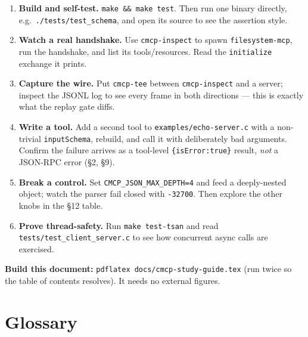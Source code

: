 \documentclass[10pt]{article}
\newcommand{\code}[1]{\texttt{\small #1}}
\begin{document}
\begin{enumerate}
  \item \textbf{Build and self-test.} \code{make \&\& make test}. Then run one
    binary directly, e.g.\ \code{./tests/test\_schema}, and open its source to see
    the assertion style.
  \item \textbf{Watch a real handshake.} Use \code{cmcp-inspect} to spawn
    \code{filesystem-mcp}, run the handshake, and list its tools/resources. Read
    the \code{initialize} exchange it prints.
  \item \textbf{Capture the wire.} Put \code{cmcp-tee} between
    \code{cmcp-inspect} and a server; inspect the JSONL log to see every frame in
    both directions --- this is exactly what the replay gate diffs.
  \item \textbf{Write a tool.} Add a second tool to \code{examples/echo-server.c}
    with a non-trivial \code{inputSchema}, rebuild, and call it with deliberately
    bad arguments. Confirm the failure arrives as a tool-level
    \code{\{isError:true\}} result, \emph{not} a JSON-RPC error (\S2, \S9).
  \item \textbf{Break a control.} Set \code{CMCP\_JSON\_MAX\_DEPTH=4} and feed a
    deeply-nested object; watch the parser fail closed with \code{-32700}. Then
    explore the other knobs in the \S12 table.
  \item \textbf{Prove thread-safety.} Run \code{make test-tsan} and read
    \code{tests/test\_client\_server.c} to see how concurrent async calls are
    exercised.
\end{enumerate}

\textbf{Build this document:} \code{pdflatex docs/cmcp-study-guide.tex} (run twice
so the table of contents resolves). It needs no external figures.

\section{Glossary}
\end{document}
